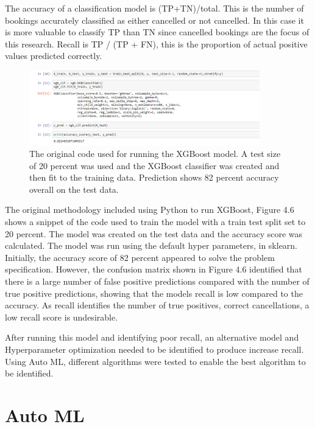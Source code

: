 The accuracy of a classification model is (TP+TN)/total. This is the number of bookings accurately classified as either cancelled or not cancelled. In this case it is more valuable to classify TP than TN since cancelled bookings are the focus of this research. Recall is TP / (TP + FN), this is the proportion of actual positive values predicted correctly.

\vspace{5mm}

 \begin{figure}[H]
 \centering
\includegraphics[width=10cm]{figures/xg_boost_code.png}
 \caption{The original code used for running the XGBoost model. A test size of 20 percent was used and the XGBoost classifier was created and then fit to the training data. Prediction shows 82 percent accuracy overall on the test data.}
\end{figure}

The original methodology included using Python to run XGBoost, Figure 4.6 shows a snippet of the code used to train the model with a train test split set to 20 percent. The model was created on the test data and the accuracy score was calculated. The model was run using the default hyper parameters, in sklearn. Initially, the accuracy score of 82 percent appeared to solve the problem specification. However, the confusion matrix shown in Figure 4.6 identified that there is a large number of false positive predictions compared with the number of true positive predictions, showing that the models recall is low compared to the accuracy. As recall identifies the number of true positives, correct cancellations, a low recall score is undesirable.


After running this model and identifying poor recall, an alternative model and Hyperparameter optimization needed to be identified to produce increase recall. Using Auto ML, different algorithms were tested to enable the best algorithm to be identified. 

\section{Auto ML}

